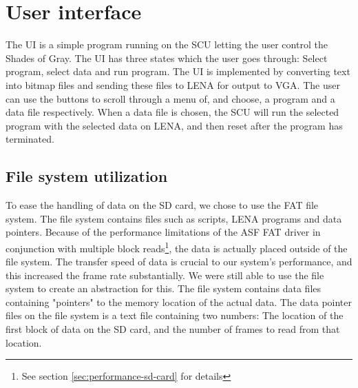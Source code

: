 \section{User interface}
The \ac{UI} is a simple program running on the \ac{SCU} letting the user control the { Shades of Gray}. The \ac{UI} has three states which the user goes through: Select program, select data and run program. The \ac{UI} is implemented by converting text into bitmap files and sending these files to \ac{LENA} for output to VGA. The user can use the buttons to scroll through a menu of, and choose, a program and a data file respectively. When a data file is chosen, the \ac{SCU} will run the selected program with the selected data on \ac{LENA}, and then reset after the program has terminated.

\subsection{File system utilization}
To ease the handling of data on the SD card, we chose to use the FAT
file system. The file system contains files such as scripts, \ac{LENA}
programs and data pointers. Because of the performance limitations of
the \ac{ASF} FAT driver in conjunction with multiple block
reads\footnote{See section \ref{sec:performance-sd-card} for details}, the
data is actually placed outside of the file system. The transfer speed
of data is crucial to our system's performance, and this increased the
frame rate substantially. We were still able to use the file system to
create an abstraction for this. The file system contains data files
containing "pointers" to the memory location of the actual data. The
data pointer files on the file system is a text file containing two
numbers: The location of the first block of data on the SD card, and the
number of frames to read from that location.


